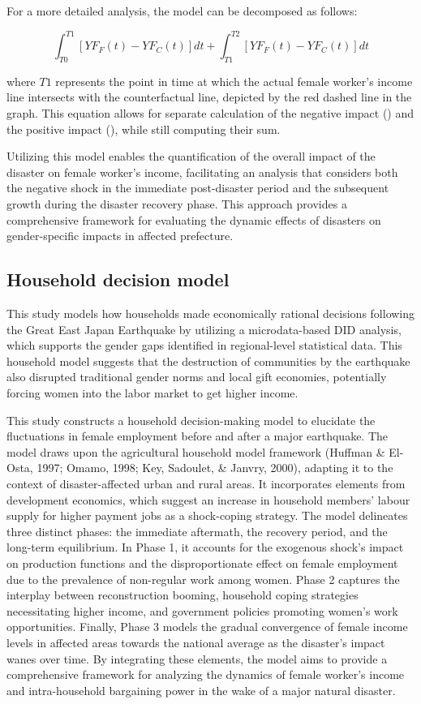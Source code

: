 \documentclass[a4paper,12pt]{article}
\begin{document}
For a more detailed analysis, the model can be decomposed as follows:

\begin{equation}
\int_{T0}^{T1} [YF_F(t) - YF_C(t)] dt + \int_{T1}^{T2} [YF_F(t) - YF_C(t)] dt
\end{equation}

where $T1$ represents the point in time at which the actual female worker's income line intersects with the counterfactual line, depicted by the red dashed line in the graph. This equation allows for separate calculation of the negative impact () and the positive impact (), while still computing their sum.

Utilizing this model enables the quantification of the overall impact of the disaster on female worker's income, facilitating an analysis that considers both the negative shock in the immediate post-disaster period and the subsequent growth during the disaster recovery phase. This approach provides a comprehensive framework for evaluating the dynamic effects of disasters on gender-specific impacts in affected prefecture.


\subsection{Household decision model}
\label{sec5.1}

This study models how households made economically rational decisions following the Great East Japan Earthquake by utilizing a microdata-based DID analysis, which supports the gender gaps identified in regional-level statistical data. This household model suggests that the destruction of communities by the earthquake also disrupted traditional gender norms and local gift economies, potentially forcing women into the labor market to get higher income.

This study constructs a household decision-making model to elucidate the fluctuations in female employment before and after a major earthquake. The model draws upon the agricultural household model framework (Huffman \& El-Osta, 1997; Omamo, 1998; Key, Sadoulet, \& Janvry, 2000), adapting it to the context of disaster-affected urban and rural areas. It incorporates elements from development economics, which suggest an increase in household members' labour supply for higher payment jobs as a shock-coping strategy.
The model delineates three distinct phases: the immediate aftermath, the recovery period, and the long-term equilibrium. In Phase 1, it accounts for the exogenous shock's impact on production functions and the disproportionate effect on female employment due to the prevalence of non-regular work among women. Phase 2 captures the interplay between reconstruction booming, household coping strategies necessitating higher income, and government policies promoting women's work opportunities. Finally, Phase 3 models the gradual convergence of female income levels in affected areas towards the national average as the disaster's impact wanes over time.
By integrating these elements, the model aims to provide a comprehensive framework for analyzing the dynamics of female worker's income and intra-household bargaining power in the wake of a major natural disaster.


\nocite{*}

\end{document}

